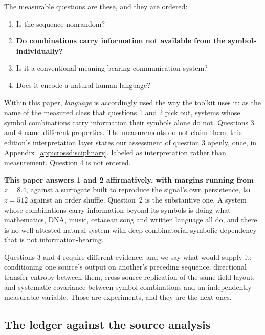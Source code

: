 \documentclass[11pt,a4paper]{article}
\begin{document}
The measurable questions are these, and they are ordered:
\begin{enumerate}[leftmargin=1.6em,itemsep=1pt]
\item Is the sequence nonrandom?
\item \textbf{Do combinations carry information not available from the symbols
individually?}
\item Is it a conventional meaning-bearing communication system?
\item Does it encode a natural human language?
\end{enumerate}

Within this paper, \emph{language} is accordingly used the way the toolkit uses it: as
the name of the measured class that questions 1 and 2 pick out, systems whose symbol
combinations carry information their symbols alone do not. Questions 3 and 4 name
different properties. The measurements do not claim them; this edition's
interpretation layer states our assessment of question 3 openly, once, in
Appendix~\ref{app:crossdisciplinary}, labeled as interpretation rather than
measurement. Question 4 is not entered.

\textbf{This paper answers 1 and 2 affirmatively, with margins running from} $z = 8.4$,
against a surrogate built to reproduce the signal's own persistence, \textbf{to}
$z = 512$ against an order shuffle. Question~2 is the substantive one. A system whose combinations carry
information beyond its symbols is doing what mathematics, DNA, music, cetacean song and
written language all do, and there is no well-attested natural system with deep
combinatorial symbolic dependency that is not information-bearing.

Questions 3 and 4 require different evidence, and we say what would supply it:
conditioning one source's output on another's preceding sequence, directional transfer
entropy between them, cross-source replication of the same field layout, and systematic
covariance between symbol combinations and an independently measurable variable. Those
are experiments, and they are the next ones.

\subsection{The ledger against the source analysis}
\label{sec:ledger}
\end{document}

